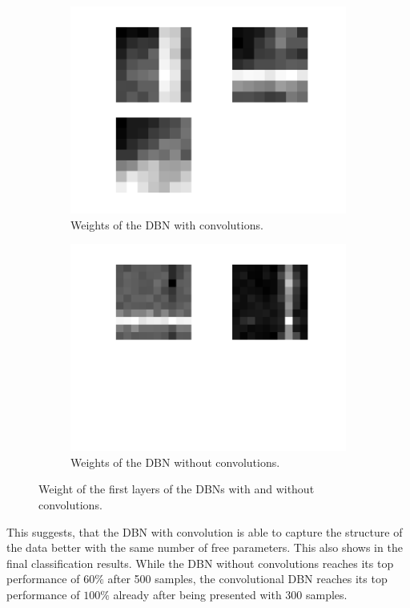\begin{figure}[h!]
	\centering
	\begin{subfigure}[t]{.45\textwidth}
  		\centering
  		\includegraphics[width=.9\linewidth]{imgs/cvsnc/wc.png}
  		\caption{Weights of the DBN with convolutions.}
  		\label{fig:sub1}
	\end{subfigure}%
	\begin{subfigure}[t]{.45\textwidth}
  		\centering
  		\includegraphics[width=.9\linewidth]{imgs/cvsnc/wnc.png}
  		\caption{Weights of the DBN without convolutions.}
  		\label{fig:sub2}
	\end{subfigure}
	\caption{Weight of the first layers of the DBNs with and without convolutions.}
	\label{fig:stripes}
\end{figure}


This suggests, that the DBN with convolution is able to capture the structure of the data better with the same number of free parameters. 
This also shows in the final classification results.
While the DBN without convolutions reaches its top performance of $60 \%$ after 500 samples, the convolutional DBN reaches its top performance of $100 \%$ already after being presented with 300 samples.
 


